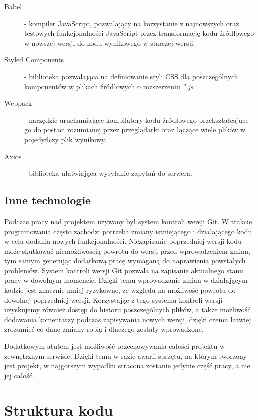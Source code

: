 \documentclass[10pt,polish,a4paper,oneside]{ppfcmthesis}
\begin{document}
\begin{description}
  \item[Babel] - kompiler JavaScript, pozwalający na korzystanie z najnowszych oraz testowych funkcjonalności
  JavaScript przez transformację kodu \'zródłowego w nowszej wersji do kodu wynikowego w starszej wersji.
  \item[Styled Components] - biblioteka pozwalająca na definiowanie styli CSS dla poszczególnych komponentów
  w plikach \'zródłowych o rozszerzeniu \textit{*.js}.
  \item[Webpack] - narzędzie uruchamiające kompilatory kodu \'zródłowego przekształcające go do postaci rozumianej
  przez przeglądarki oraz łączące wiele plików w pojedyńczy plik wynikowy.
  \item[Axios] - biblioteka ułatwiająca wysyłanie zapytań do serwera.
\end{description}

\subsection{Inne technologie}

Podczas pracy nad projektem używany był system kontroli wersji Git. W trakcie programowania
często zachodzi potrzeba zmiany istniejącego i działającego kodu w celu dodania nowych funkcjonalności.
Niezapisanie poprzedniej wersji kodu może skutkowa\'c niemożliwością powrotu do wersji przed
wprowadzeniem zmian, tym samym generując dodatkową pracę wymaganą do naprawienia powstałych
problemów. System kontroli wersji Git pozwala na zapisanie aktualnego stanu pracy w dowolnym momencie.
Dzięki temu wprowadzanie zmian w działającym kodzie jest znacznie mniej ryzykowne, ze względu na
możliwoś\'c powrotu do dowolnej poprzedniej wersji. Korzystając z tego systemu kontroli wersji uzyskujemy
również dostęp do historii poszczególnych plików, a także możliwoś\'c dodawania komentarzy podczas zapisywania nowych wersji,
dzięki czemu łatwiej zrozumie\'c co dane zmiany robią i dlaczego zostały wprowadzone.

Dodatkowym atutem jest możliwoś\'c przechowywania całości projektu w zewnętrznym serwisie. Dzięki
temu w razie awarii sprzętu, na którym tworzony jest projekt, w najgorszym wypadku stracona
zostanie jedynie częś\'c pracy, a nie jej całoś\'c.

\section{Struktura kodu}
\end{document}
